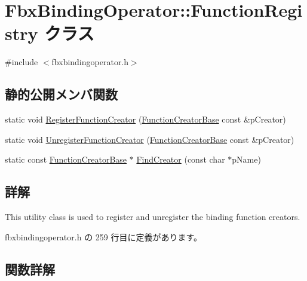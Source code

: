 \hypertarget{class_fbx_binding_operator_1_1_function_registry}{}\section{Fbx\+Binding\+Operator\+:\+:Function\+Registry クラス}
\label{class_fbx_binding_operator_1_1_function_registry}


{\ttfamily \#include $<$fbxbindingoperator.\+h$>$}

\subsection*{静的公開メンバ関数}
\begin{DoxyCompactItemize}
\item 
static void \hyperlink{class_fbx_binding_operator_1_1_function_registry_a5ecec300a953a369fb892a46a362e384}{Register\+Function\+Creator} (\hyperlink{class_fbx_binding_operator_1_1_function_creator_base}{Function\+Creator\+Base} const \&p\+Creator)
\item 
static void \hyperlink{class_fbx_binding_operator_1_1_function_registry_a8395c776992e40df9639032984dcc094}{Unregister\+Function\+Creator} (\hyperlink{class_fbx_binding_operator_1_1_function_creator_base}{Function\+Creator\+Base} const \&p\+Creator)
\item 
static const \hyperlink{class_fbx_binding_operator_1_1_function_creator_base}{Function\+Creator\+Base} $\ast$ \hyperlink{class_fbx_binding_operator_1_1_function_registry_af7d48205eac024266e04018d181b92d0}{Find\+Creator} (const char $\ast$p\+Name)
\end{DoxyCompactItemize}


\subsection{詳解}
This utility class is used to register and unregister the binding function creators. 

 fbxbindingoperator.\+h の 259 行目に定義があります。



\subsection{関数詳解}
\mbox{\label{class_fbx_binding_operator_1_1_function_registry_af7d48205eac024266e04018d181b92d0}} 
